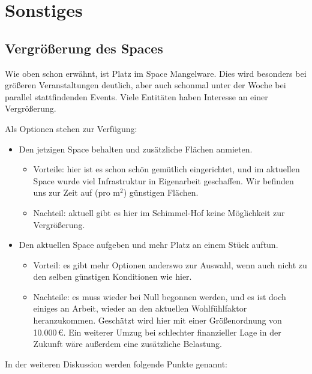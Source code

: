 \documentclass{s0minutes}
\begin{document}
\section{Sonstiges}

\subsection{Vergrößerung des Spaces}

Wie oben schon erwähnt, ist Platz im Space Mangelware. Dies wird besonders bei
größeren Veranstaltungen deutlich, aber auch schonmal unter der Woche bei
parallel stattfindenden Events. Viele Entitäten haben Interesse an einer
Vergrößerung.

Als Optionen stehen zur Verfügung:
\begin{itemize}
  \item Den jetzigen Space behalten und zusätzliche Flächen anmieten.
    \begin{itemize}
      \item Vorteile: hier ist es schon schön gemütlich eingerichtet,
        und im aktuellen Space wurde viel Infrastruktur in Eigenarbeit
        geschaffen.
        Wir befinden uns zur Zeit auf (pro m$^2$) günstigen Flächen.
      \item Nachteil: aktuell gibt es hier im Schimmel-Hof keine Möglichkeit zur
        Vergrößerung.
    \end{itemize}
  \item Den aktuellen Space aufgeben und mehr Platz an einem Stück auftun.
    \begin{itemize}
      \item Vorteil: es gibt mehr Optionen anderswo zur Auswahl, wenn auch nicht
        zu den selben günstigen Konditionen wie hier.
      \item Nachteile: es muss wieder bei Null begonnen werden, und es ist doch
        einiges an Arbeit, wieder an den aktuellen Wohlfühlfaktor heranzukommen.
        Geschätzt wird hier mit einer Größenordnung von 10{.}000\,€.
        Ein weiterer Umzug bei schlechter finanzieller Lage in der Zukunft wäre
        außerdem eine zusätzliche Belastung.
    \end{itemize}
\end{itemize}

In der weiteren Diskussion werden folgende Punkte genannt:
\end{document}
